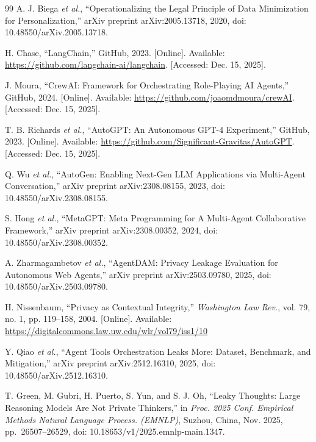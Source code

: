 \documentclass{ieeeaccess}
\begin{document}
\begin{thebibliography}{99}
A. J. Biega \emph{et al.}, ``Operationalizing the Legal Principle of Data Minimization for Personalization,'' arXiv preprint arXiv:2005.13718, 2020, doi: 10.48550/arXiv.2005.13718.

H. Chase, ``LangChain,'' GitHub, 2023. [Online]. Available: \url{https://github.com/langchain-ai/langchain}. [Accessed: Dec. 15, 2025].

J. Moura, ``CrewAI: Framework for Orchestrating Role-Playing AI Agents,'' GitHub, 2024. [Online]. Available: \url{https://github.com/joaomdmoura/crewAI}. [Accessed: Dec. 15, 2025].

T. B. Richards \emph{et al.}, ``AutoGPT: An Autonomous GPT-4 Experiment,'' GitHub, 2023. [Online]. Available: \url{https://github.com/Significant-Gravitas/AutoGPT}. [Accessed: Dec. 15, 2025].

Q. Wu \emph{et al.}, ``AutoGen: Enabling Next-Gen LLM Applications via Multi-Agent Conversation,'' arXiv preprint arXiv:2308.08155, 2023, doi: 10.48550/arXiv.2308.08155.

S. Hong \emph{et al.}, ``MetaGPT: Meta Programming for A Multi-Agent Collaborative Framework,'' arXiv preprint arXiv:2308.00352, 2024, doi: 10.48550/arXiv.2308.00352.

A. Zharmagambetov \emph{et al.}, ``AgentDAM: Privacy Leakage Evaluation for Autonomous Web Agents,'' arXiv preprint arXiv:2503.09780, 2025, doi: 10.48550/arXiv.2503.09780.

H. Nissenbaum, ``Privacy as Contextual Integrity,'' \emph{Washington Law Rev.}, vol. 79, no. 1, pp. 119--158, 2004. [Online]. Available: \url{https://digitalcommons.law.uw.edu/wlr/vol79/iss1/10}

Y. Qiao \emph{et al.}, ``Agent Tools Orchestration Leaks More: Dataset, Benchmark, and Mitigation,'' arXiv preprint arXiv:2512.16310, 2025, doi: 10.48550/arXiv.2512.16310.

T. Green, M. Gubri, H. Puerto, S. Yun, and S. J. Oh, ``Leaky Thoughts: Large Reasoning Models Are Not Private Thinkers,'' in \emph{Proc. 2025 Conf. Empirical Methods Natural Language Process. (EMNLP)}, Suzhou, China, Nov. 2025, pp.~26507--26529, doi: 10.18653/v1/2025.emnlp-main.1347.


\end{thebibliography}
\end{document}
